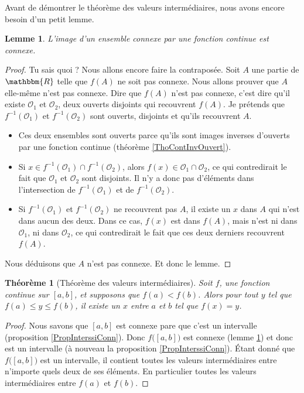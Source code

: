 \documentclass[a4paper,12pt]{book}
\newcommand{\eR}{\mathbbm{R}}
\newcounter{numtho}
\theoremstyle{mes_exemples}	\newtheorem{exemple}[numtho]{Exemple}
\theoremstyle{mes_tho}
\newtheorem{lemma}[numtho]{Lemme}
\newtheorem{theorem}[numtho]{Théorème}
\newcommand{\mO}{\mathcal{O}}
\begin{document}
Avant de démontrer le théorème des valeurs intermédiaires, nous avons encore besoin d'un petit lemme.
\begin{lemma}	\label{LemConncontconn}
L'image d'un ensemble connexe par une fonction continue est connexe.
\end{lemma}

\begin{proof}
Tu sais quoi ? Nous allons encore faire la contraposée. Soit $A$ une partie de $\eR$ telle que $f(A)$ ne soit pas connexe. Nous allons prouver que $A$ elle-même n'est pas connexe. Dire que $f(A)$ n'est pas connexe, c'est dire qu'il existe $\mO_1$ et $\mO_2$, deux ouverts disjoints qui recouvrent $f(A)$. Je prétends que $f^{-1}(\mO_1)$ et $f^{-1}(\mO_2)$ sont ouverts, disjoints et qu'ils recouvrent $A$.
\begin{itemize}
\item Ces deux ensembles sont ouverts parce qu'ils sont images inverses d'ouverts par une fonction continue (théorème \ref{ThoContInvOuvert}).
\item Si $x\in f^{-1}(\mO_1)\cap f^{-1}(\mO_2)$, alors $f(x)\in \mO_1\cap\mO_2$, ce qui contredirait le fait que $\mO_1$ et $\mO_2$ sont disjoints. Il n'y a donc pas d'éléments dans l'intersection de $f^{-1}(\mO_1)$ et de $f^{-1}(\mO_2)$.
\item Si $f^{-1}(\mO_1)$ et $f^{-1}(\mO_2)$ ne recouvrent pas $A$, il existe un $x$ dans $A$ qui n'est dans aucun des deux. Dans ce cas, $f(x)$ est dans $f(A)$, mais n'est ni dans $\mO_1$, ni dans $\mO_2$, ce qui contredirait le fait que ces deux derniers recouvrent $f(A)$.
\end{itemize}
Nous déduisons que $A$ n'est pas connexe. Et donc le lemme.
\end{proof}

\begin{theorem}[Théorème des valeurs intermédiaires]		\label{ThoValInter}
Soit $f$, une fonction continue sur $[a,b]$, et supposons que $f(a)<f(b)$. Alors pour tout $y$ tel que $f(a)\leq y\leq f(b)$, il existe un $x$ entre $a$ et $b$ tel que $f(x)=y$.
\end{theorem}

\begin{proof}
Nous savons que $[a,b]$ est connexe pare que c'est un intervalle (proposition \ref{PropInterssiConn}). Donc $f\big( [a,b] \big)$ est connexe (lemme \ref{LemConncontconn}) et donc est un intervalle (à nouveau la proposition \ref{PropInterssiConn}). Étant donné que $f\big( [a,b] \big)$ est un intervalle, il contient toutes les valeurs intermédiaires entre n'importe quels deux de ses éléments. En particulier toutes les valeurs intermédiaires entre $f(a)$ et $f(b)$.
\end{proof}
\end{document}
